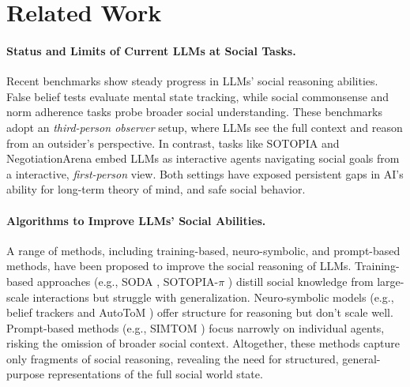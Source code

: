 

\vspace{-0.5em}
\section{Related Work}
\label{sec:related-work}




\paragraph{Status and Limits of Current LLMs at Social Tasks.}
\label{subsec:status-and-limits-of-current-llms-at-social-tasks}
Recent benchmarks show steady progress in LLMs' social reasoning abilities. 
False belief tests \citep{kim-etal-2023-fantom, wu-etal-2023-hi} evaluate mental state tracking, while social commonsense and norm adherence tasks \citep{sap2019socialiqacommonsensereasoningsocial, zhou2023cobraframescontextualreasoning} probe broader social understanding. 
These benchmarks adopt an \textit{third-person observer} setup, where LLMs see the full context and reason from an outsider’s perspective. In contrast, tasks like SOTOPIA \citep{zhou2024sotopia} and NegotiationArena \citep{bianchi2024llmsnegotiatenegotiationarenaplatform} embed LLMs as interactive agents navigating social goals from a interactive, \textit{first-person} view. 
Both settings have exposed persistent gaps in AI's ability for long-term theory of mind, and safe social behavior.

\paragraph{Algorithms to Improve LLMs' Social Abilities.}
\label{subsec:algorithms-to-improve-llms-social-abilities}
A range of methods, including training-based, neuro-symbolic, and prompt-based methods, have been proposed to improve the social reasoning of LLMs.  Training-based approaches (e.g., SODA \citep{kim2023sodamillionscaledialoguedistillation}, SOTOPIA-$\pi$ \citep{wang2024sotopiapiinteractivelearningsocially}) distill social knowledge from large-scale interactions but struggle with generalization. 
Neuro-symbolic models (e.g., belief trackers \citep{sclar2023mindinglanguagemodelslack} and AutoToM \citep{zhang2025autotomautomatedbayesianinverse}) offer structure for reasoning but don’t scale well. 
Prompt-based methods (e.g., SIMTOM \citep{wilf2023thinktwiceperspectivetakingimproves}) focus narrowly on individual agents, risking the omission of broader social context.
Altogether, these methods capture only fragments of social reasoning, revealing the need for structured, general-purpose representations of the full social world state.

